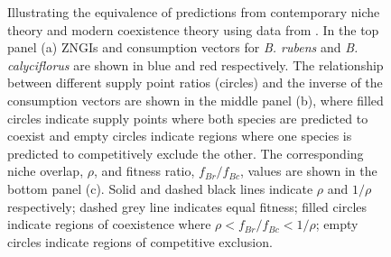 \newpage
\begin{figure}[h!]
\centering
{}
\caption[Illustrating the equivalence of predictions from contemporary niche theory and modern coexistence theory using data from \citet{Rothhaupt1988}.]
	{\hspace{1mm}Illustrating the equivalence of predictions from contemporary niche theory and modern coexistence theory using data from \citet{Rothhaupt1988}. In the top panel (a) ZNGIs and consumption vectors for \textit{B. rubens} and \textit{B. calyciflorus} are shown in blue and red respectively. The relationship between different supply point ratios (circles) and the inverse of the consumption vectors are shown in the middle panel (b), where filled circles indicate supply points where both species are predicted to coexist and empty circles indicate regions where one species is predicted to competitively exclude the other. The corresponding niche overlap, $\rho$, and fitness ratio, $f_{Br}/f_{Bc}$, values are shown in the bottom panel (c). Solid and dashed black lines indicate $\rho$ and $1/\rho$ respectively; dashed grey line indicates equal fitness; filled circles indicate regions of coexistence where  $\rho < f_{Br}/f_{Bc} < 1/\rho$; empty circles indicate regions of competitive exclusion.}
\label{fig:Box2-fig-Rothhaupt}
\end{figure}



